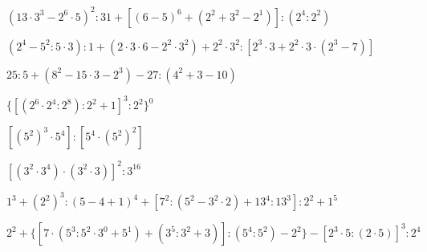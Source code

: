 \begin{esercizio} %
\((13\cdot3^3-2^6\cdot5)^2:31+[(6-5)^6+(2^2+3^2-2^1)]:(2^4:2^2)\) 
\end{esercizio}
\begin{esercizio} %
\((2^4-5^2:5\cdot3):1+(2\cdot3\cdot6-2^2\cdot3^2)+2^2\cdot3^2:
[2^3\cdot3+2^2\cdot3\cdot(2^3-7)]\) 
\end{esercizio}
\begin{esercizio} %
\(25:5+(8^2-15\cdot3-2^3)-27:(4^2+3-10)\) 
\end{esercizio}
\begin{esercizio} %
\(\{[(2^6\cdot2^4:2^8):2^2+1]^3:2^2\}^0\) 
\end{esercizio}
\begin{esercizio} %
\([(5^2)^3\cdot5^4]:[5^4\cdot(5^2)^2]\) 
\end{esercizio}
\begin{esercizio} %
\([(3^2\cdot3^4)\cdot(3^2\cdot3)]^2:3^{16}\) 
\end{esercizio}
\begin{esercizio} %
\(1^3+(2^2)^3:(5-4+1)^4+[7^2:(5^2-3^2\cdot2)+13^4:13^3]:2^2+1^5\) 
\end{esercizio}
\begin{esercizio} %
\(2^2+\{[7\cdot(5^3:5^2\cdot3^0+5^1)+(3^5:3^2+3)]:(5^4:5^2)-2^2\}-
[2^3\cdot5:(2\cdot5)]^3:2^4\) 
\end{esercizio}
% 

\subsubsection*{}

